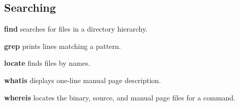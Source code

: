 \subsection{Searching}
\textbf{find} searches for files in a directory hierarchy.

\textbf{grep} prints lines matching a pattern.

\textbf{locate} finds files by names.

\textbf{whatis} displays one-line manual page description.

\textbf{whereis} locates the binary, source, 
and manual page files for a command.

